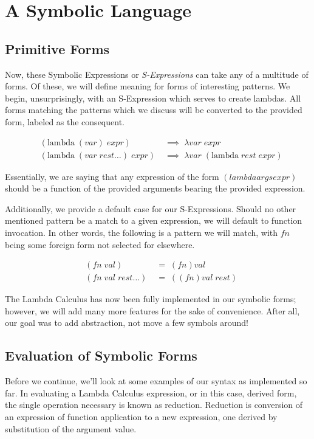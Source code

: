 \section{A Symbolic Language}
\subsection{Primitive Forms}
Now, these Symbolic Expressions or \emph{S-Expressions} can take any of a multitude of
forms. Of these, we will define meaning for forms of interesting patterns. We
begin, unsurprisingly, with an S-Expression which serves to create lambdas. All
forms matching the patterns which we discuss will be converted to the provided
form, labeled as the consequent.

\begin{figure}[ht]
\caption{}\label{scheme}
\begin{align*}
& (\text{lambda} \; (var) \; expr) \; &\implies \; \lambda var \; expr
\\& (\text{lambda} \; (var \; rest\dots) \; expr) \; &\implies \; \lambda var \; (\text{lambda} \; rest \; expr)
\end{align*}
\end{figure}

Essentially, we are saying that any expression of the form $(lambda args expr)$
should be a function of the provided arguments bearing the provided expression. 

Additionally, we provide a default case for our S-Expressions. Should no other
mentioned pattern be a match to a given expression, we will default to function
invocation. In other words, the following is a pattern we will match, with $fn$
being some foreign form not selected for elsewhere. 

\begin{figure}[ht]
\caption{}\label{scheme}
\begin{align*}
& (fn \; val) \; &= \; (fn)val
\\& (fn \; val \; rest\dots) \; &= \; ((fn)val \; rest)
\end{align*}
\end{figure}

The Lambda Calculus has now been fully implemented in our symbolic forms; however, 
we will add many more features for the sake of convenience. After all, our goal
was to add abstraction, not move a few symbols around!


\subsection{Evaluation of Symbolic Forms}
Before we continue, we'll look at some examples of our syntax as implemented so
far. In evaluating a Lambda Calculus expression, or in this case, derived form,
the single operation necessary is known as reduction. Reduction is conversion of
an expression of function application to a new expression, one derived by
substitution of the argument value.

